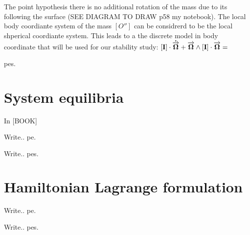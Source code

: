 The point hypothesis there is no additional rotation of the mass due to its following the surface (SEE DIAGRAM TO DRAW p58 my notebook). The local body coordiante system of the mass $[O'']$ can be considrerd to be the local shperical coordiante system. This leads to a the discrete model in body coordinate that will be used for our stability study:
$[\bf I]\cdot \dot{\overrightarrow{\bf \Omega}} + \overrightarrow{\bf \Omega} \wedge [\bf I]\cdot \overrightarrow{\bf \Omega}=$




 \glspl{pe}.

\section{System equilibria}
\label{System equilibrian}

In [BOOK]  

Write.. \gls{pe}.

Write.. \glspl{pe}.

\section{Hamiltonian Lagrange formulation}
\label{Hamiltonian Lagrange formulation}

Write.. \gls{pe}.

Write.. \glspl{pe}.

%
%
%
%
%
